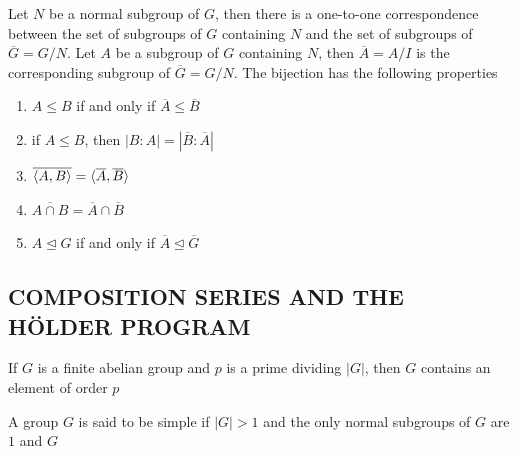 \begin{theorem}
	Let $N$ be a normal subgroup of $G$, then there is a one-to-one correspondence between the set of subgroups of $G$ containing $N$ and the set of subgroups of $\overline{G} = G/N$. Let $A$ be a subgroup of $G$ containing $N$, then $\overline{A} = A/I$ is the corresponding subgroup of $\overline{G} = G/N$. The bijection has the following properties
	\begin{enumerate}
		\item $A \leq B$ if and only if $\overline{A} \leq \overline{B}$
		\item if $A \leq B$, then $|B:A| = |\overline{B}:\overline{A}|$
		\item $\overline{\langle A, B\rangle} = \langle\overline{A}, \overline{B}\rangle$
		\item $\overline{A \cap B} = \overline{A} \cap \overline{B}$
		\item $A \trianglelefteq G$ if and only if $\overline{A} \trianglelefteq \overline{G}$
	\end{enumerate}
	
	
	
\end{theorem}

\subsection{COMPOSITION SERIES AND THE HÖLDER PROGRAM}

\begin{proposition}
	If $G$ is a finite abelian group and $p$ is a prime dividing $|G|$, then $G$ contains an element of order $p$
\end{proposition}

\begin{definition}
	A group $G$ is said to be simple if $|G| > 1$ and the only normal subgroups of $G$ are $1$ and $G$
\end{definition}

